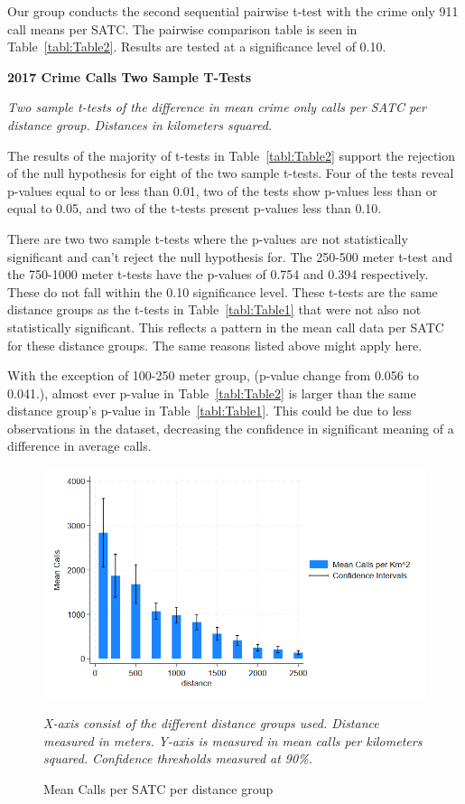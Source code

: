 \documentclass[12pt]{article}
\begin{document}
Our group conducts the second sequential pairwise t-test with the crime only 911 call means per SATC. The pairwise comparison table is seen in Table~\ref{tabl:Table2}. Results are tested at a significance level of 0.10. 


\begin{table}[hb!]
\begin{center}

\end{center}


\caption{\bf{2017 Crime Calls Two Sample T-Tests}}
\label{tabl:Table2}
\centering\textit{Two sample t-tests of the difference in mean crime only calls per SATC per distance group.}
\textit{Distances in kilometers squared.}
\end{table}


The results of the majority of t-tests in Table~\ref{tabl:Table2} support the rejection of the null hypothesis for eight of the two sample t-tests. Four of the tests reveal p-values equal to or less than 0.01, two of the tests show p-values less than or equal to 0.05, and two of the t-tests present p-values less than 0.10. 

There are two two sample t-tests where the p-values are not statistically significant and can't reject the null hypothesis for. The 250-500 meter t-test and the 750-1000 meter t-tests have the p-values of 0.754 and 0.394 respectively. These do not fall within the 0.10 significance level. These t-tests are the same distance groups as the t-tests in Table~\ref{tabl:Table1} that were not also not statistically significant. This reflects a pattern in the mean call data per SATC for these distance groups. The same reasons listed above might apply here.

With the exception of 100-250 meter group, (p-value change from 0.056 to 0.041.), almost ever p-value in Table~\ref{tabl:Table2} is larger than the same distance group's p-value in Table~\ref{tabl:Table1}. This could be due to less observations in the dataset, decreasing the confidence in significant meaning of a difference in average calls. 

\begin{figure}[htbp]
    \centering
\includegraphics[width=0.75\linewidth]{Reproducibility Package/Visual Graphics/CI_Graph.png}
    \caption{Mean Calls per SATC per distance group}
    \label{fig:Figure3}
     \textit{X-axis consist of the different distance groups used. Distance measured in meters.}
    \textit{Y-axis is measured in mean calls per kilometers squared.}
    \textit{Confidence thresholds measured at 90\%.}
\end{figure}
\end{document}
